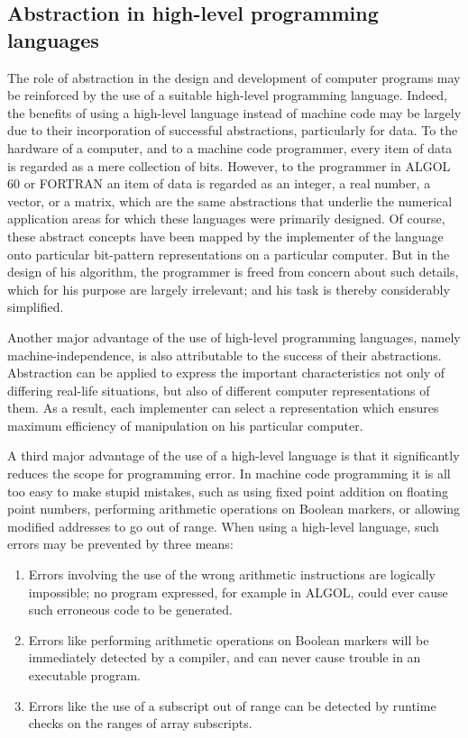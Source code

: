 \documentclass[twoside,11pt]{book}
\begin{document}
\subsection{Abstraction in high-level programming languages}

The role of abstraction in the design and development of computer programs may be reinforced by the use of a suitable high-level programming language. Indeed, the benefits of using a high-level language instead of machine code may be largely due to their incorporation of successful abstractions, particularly for data. To the hardware of a computer, and to a machine code programmer, every item of data is regarded as a mere collection of bits. However, to the programmer in ALGOL 60 or FORTRAN an item of data is regarded as an integer, a real number, a vector, or a matrix, which are the same abstractions that underlie the numerical application areas for which these languages were primarily designed. Of course, these abstract concepts have been mapped by the implementer of the language onto particular bit-pattern representations on a particular computer. But in the design of his algorithm, the programmer is freed from concern about such details, which for his purpose are largely irrelevant; and his task is thereby considerably simplified.

Another major advantage of the use of high-level programming languages, namely machine-independence, is also attributable to the success of their abstractions. Abstraction can be applied to express the important characteristics not only of differing real-life situations, but also of different computer representations of them. As a result, each implementer can select a representation which ensures maximum efficiency of manipulation on his particular computer.

A third major advantage of the use of a high-level language is that it significantly reduces the scope for programming error. In machine code programming it is all too easy to make stupid mistakes, such as using fixed point addition on floating point numbers, performing arithmetic operations on Boolean markers, or allowing modified addresses to go out of range. When using a high-level language, such errors may be prevented by three means:

\begin{enumerate}[wide, nosep, label=(\arabic*)]
	\item Errors involving the use of the wrong arithmetic instructions are logically impossible; no program expressed, for example in ALGOL, could ever cause such erroneous code to be generated.
	\item Errors like performing arithmetic operations on Boolean markers will be immediately detected by a compiler, and can never cause trouble in an executable program.
	\item Errors like the use of a subscript out of range can be detected by runtime checks on the ranges of array subscripts.
\end{enumerate}
\end{document}
